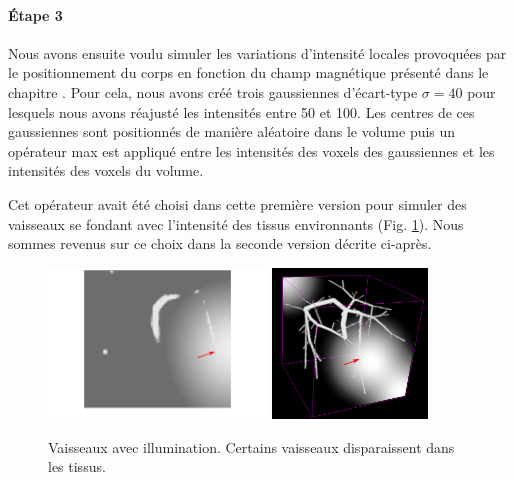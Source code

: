 \paragraph{Étape 3}
Nous avons ensuite voulu simuler les variations d'intensité locales provoquées par le positionnement du corps en fonction du champ magnétique présenté dans le chapitre \chapContextN{}. Pour cela, nous avons créé trois gaussiennes d'écart-type $\sigma=40$ pour lesquels nous avons réajusté les intensités entre 50 et 100. Les centres de ces gaussiennes sont positionnés de manière aléatoire dans le volume puis un opérateur max est appliqué entre les intensités des voxels des gaussiennes et les intensités des voxels du volume.

Cet opérateur avait été choisi dans cette première version pour simuler des vaisseaux se fondant avec l'intensité des tissus environnants (Fig. \ref{fig:VBI}). Nous sommes revenus sur ce choix dans la seconde version décrite ci-après.
\begin{figure}[!ht]
  \centering
  \includegraphics[height=4cm]{Images/2D_VBI.png}
  \includegraphics[height=4cm]{Images/3D_VBI.png}
  \caption{Vaisseaux avec illumination. Certains vaisseaux disparaissent dans les tissus.}
  \label{fig:VBI}
\end{figure}
